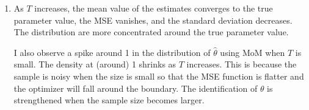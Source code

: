 \documentclass[12pt]{article}
\begin{document}
\begin{enumerate}[label=\alph*.]
\begin{figure}[htbp]
      \caption{Distrubutions of parameter estimates. Dashed vertical line indicates the true parameter value.}
   \label{fig:q2g500}
\end{figure}

\newpage
\item As $T$ increases, the mean value of the estimates converges to the true parameter value, the MSE vanishes, and the standard deviation decreases. The distribution are more concentrated around the true parameter value.

I also observe a spike around 1 in the distribution of $\hat{\theta}$ using MoM when $T$ is small. The density at (around) 1 shrinks as $T$ increases. This is because the sample is noisy when the size is small so that the MSE function is flatter and the optimizer will fall around the boundary. The identification of $\theta$ is strengthened when the sample size becomes larger.


\end{enumerate}
   

\newpage
\end{document}
